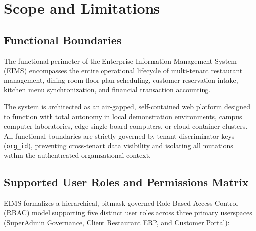 \chapter{Scope and Limitations}
\label{chap:scope_limitations}

\section{Functional Boundaries}
\label{sec:scope_boundaries}
The functional perimeter of the Enterprise Information Management System (EIMS) encompasses the entire operational lifecycle of multi-tenant restaurant management, dining room floor plan scheduling, customer reservation intake, kitchen menu synchronization, and financial transaction accounting.

The system is architected as an air-gapped, self-contained web platform designed to function with total autonomy in local demonstration environments, campus computer laboratories, edge single-board computers, or cloud container clusters. All functional boundaries are strictly governed by tenant discriminator keys (\texttt{org\_id}), preventing cross-tenant data visibility and isolating all mutations within the authenticated organizational context.

\section{Supported User Roles and Permissions Matrix}
\label{sec:scope_roles}
EIMS formalizes a hierarchical, bitmask-governed Role-Based Access Control (RBAC) model supporting five distinct user roles across three primary userspaces (SuperAdmin Governance, Client Restaurant ERP, and Customer Portal):

